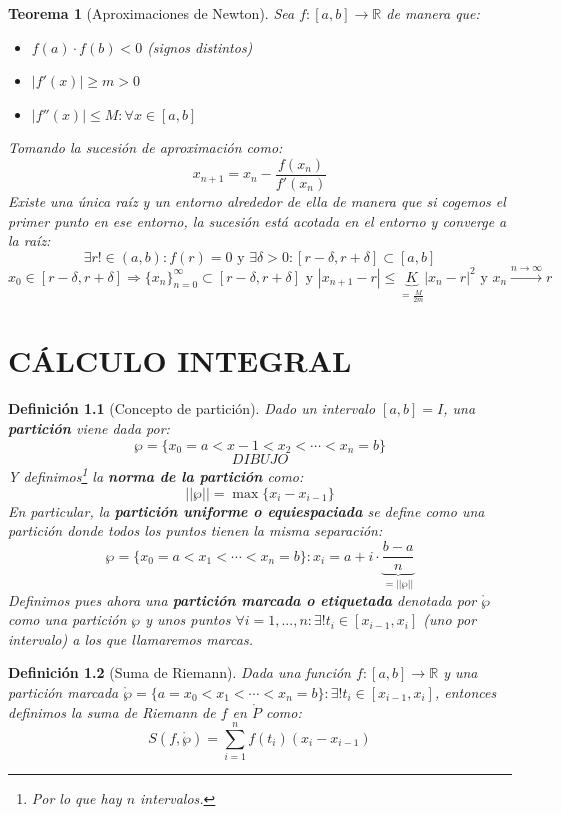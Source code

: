 \documentclass[10pt,a4paper,openright]{book}
\newtheorem{teorema}{Teorema}[chapter]
\newtheorem{definicion}{Definición}[chapter]
\begin{document}
\begin{teorema}[Aproximaciones de Newton]
Sea $f: [a,b]\rightarrow \mathbb R$ de manera que:
\begin{itemize}
\item $f(a)\cdot f(b)<0$ (signos distintos)
\item $|f'(x)|\geq m>0$
\item $|f''(x)|\leq M: \forall x\in [a,b]$
\end{itemize}
Tomando la sucesión de aproximación como:
$$x_{n+1}=x_n-\frac{f(x_n)}{f'(x_n)}$$
Existe una única raíz y un entorno alrededor de ella de manera que si cogemos el primer punto en ese entorno, la sucesión está acotada en el entorno y converge a la raíz:
$$\exists r!\in (a,b):f(r)=0\mbox{ y } \exists \delta > 0 : [r-\delta, r+\delta]\subset [a,b]$$
$$x_0\in [r-\delta, r+\delta]\Rightarrow \{x_n\}_{n=0}^\infty \subset [r-\delta, r+\delta]\mbox{ y }|x_{n+1}-r|\leq \underbrace{K}_{=\frac{M}{2m}}|x_n-r|^2\mbox{ y }x_n\xrightarrow{n\rightarrow \infty}r$$
\end{teorema}

\chapter{CÁLCULO INTEGRAL}

\begin{definicion}[Concepto de partición]
Dado un intervalo $[a,b]=I$, una \textbf{partición} viene dada por:
$$\wp=\{x_0=a<x-1<x_2<\cdots <x_n=b\}$$
$$DIBUJO$$
Y definimos\footnote{Por lo que hay $n$ intervalos.} la \textbf{norma de la partición} como:
$$||\wp||=\max\{x_i-x_{i-1}\}$$
En particular, la \textbf{partición uniforme o equiespaciada} se define como una partición donde todos los puntos tienen la misma separación:
$$\wp=\{x_0=a < x_1< \cdots < x_n=b\}: x_i = a + i \cdot \underbrace{\frac{b-a}{n}}_{=||\wp||}$$
Definimos pues ahora una \textbf{partición marcada o etiquetada} denotada por $\mathring{\wp}$ como una partición $\wp$ y unos puntos $\forall i = 1, ..., n: \exists! t_i\in [x_{i-1}, x_i]$ (uno por intervalo) a los que llamaremos marcas.
\end{definicion}

\begin{definicion}[Suma de Riemann]
Dada una función $f: [a,b]\rightarrow \mathbb R$ y una partición marcada $\mathring{\wp}=\{a=x_0<x_1<\cdots < x_n = b\}: \exists! t_i\in [x_{i-1}, x_i]$, entonces definimos la suma de Riemann de $f$ en $\mathring{P}$ como:
$$S(f,\mathring{\wp})=\sum_{i=1}^n f(t_i)(x_i-x_{i-1})$$
\end{definicion}
\end{document}
